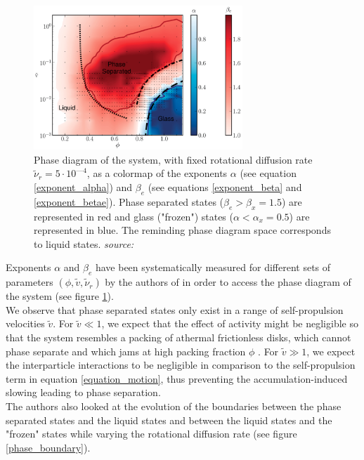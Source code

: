 \documentclass[class=report, float=false, crop=false]{standalone}
\begin{document}
\vspace{-0.5cm}
\begin{figure}[h!]
\centering
\includegraphics[width=0.7\textwidth]{figures/images/phase_diagram.png}
\caption{Phase diagram of the system, with fixed rotational diffusion rate $\tilde{\nu}_r = 5\cdot10^{—4}$, as a colormap of the exponents $\alpha$ (see equation \ref{exponent_alpha}) and $\beta_e$ (see equations \ref{exponent_beta} and \ref{exponent_betae}). Phase separated states ($\beta_e > \beta_x = 1.5$) are represented in red and glass ("frozen") states ($\alpha < \alpha_x = 0.5$) are represented in blue. The reminding phase diagram space corresponds to liquid states. \textit{source:} \cite{fily2014freezing}}
\label{phase_diagram}
\end{figure}

Exponents $\alpha$ and $\beta_e$ have been systematically measured for different sets of parameters $(\phi, \tilde{v}, \tilde{\nu}_r)$ by the authors of \cite{fily2014freezing} in order to access the phase diagram of the system (see figure \ref{phase_diagram}).\\

We observe that phase separated states only exist in a range of self-propulsion velocities $\tilde{v}$. For $\tilde{v} \ll 1$, we expect that the effect of activity might be negligible so that the system resembles a packing of athermal frictionless disks, which cannot phase separate and which jams at high packing fraction $\phi$ \cite{o2003jamming, olsson2007critical}. For $\tilde{v} \gg 1$, we expect the interparticle interactions to be negligible in comparison to the self-propulsion term in equation \ref{equation_motion}, thus preventing the accumulation-induced slowing leading to phase separation.\\

The authors also looked at the evolution of the boundaries between the phase separated states and the liquid states and between the liquid states and the "frozen" states while varying the rotational diffusion rate (see figure \ref{phase_boundary}).
\end{document}

